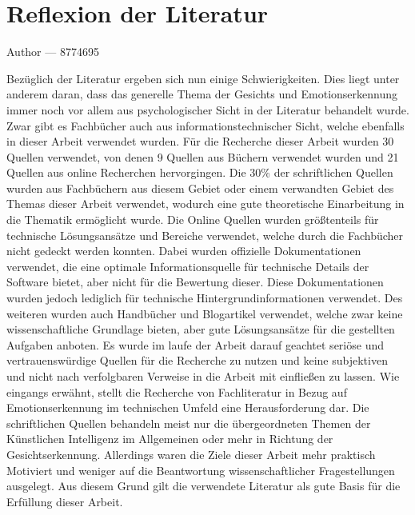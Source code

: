 \documentclass[12pt, a4paper]{report}
\makeatletter
\newcommand{\sectionauthor}[1]{%
  {\parindent0pt\vspace*{-5pt}%
  \large{Author --- }
  \linespread{1.1}\large\scshape#1%
  \par\nobreak\vspace*{35pt} }
  \@afterheading%
}
\makeatother
\begin{document}
\section{Reflexion der Literatur}
\sectionauthor{8774695}
Bezüglich der Literatur ergeben sich nun einige Schwierigkeiten. Dies liegt unter anderem daran, dass das generelle Thema der Gesichts und Emotionserkennung immer noch vor allem aus
psychologischer Sicht in der Literatur behandelt wurde. Zwar gibt es Fachbücher auch aus informationstechnischer Sicht, welche ebenfalls in dieser Arbeit verwendet wurden.
\newline
Für die Recherche dieser Arbeit wurden 30 Quellen verwendet, von denen 9 Quellen aus Büchern verwendet wurden und 21 Quellen aus online Recherchen hervorgingen. Die 30\% der schriftlichen Quellen wurden aus Fachbüchern aus diesem Gebiet oder einem verwandten Gebiet des Themas dieser Arbeit verwendet, wodurch eine gute theoretische Einarbeitung in die Thematik ermöglicht wurde. Die Online Quellen wurden größtenteils für technische Lösungsansätze und Bereiche verwendet, welche durch die Fachbücher nicht gedeckt werden konnten. Dabei wurden offizielle Dokumentationen verwendet, die eine optimale Informationsquelle für technische Details der Software bietet, aber nicht für die Bewertung dieser. Diese Dokumentationen wurden jedoch lediglich für technische Hintergrundinformationen verwendet. Des weiteren wurden auch Handbücher und Blogartikel verwendet, welche zwar keine wissenschaftliche Grundlage bieten, aber gute Lösungsansätze für die gestellten Aufgaben anboten. Es wurde im laufe der Arbeit darauf geachtet seriöse und vertrauenswürdige Quellen für die Recherche zu nutzen und keine subjektiven und nicht nach verfolgbaren Verweise in die Arbeit mit einfließen zu lassen.
\newline
Wie eingangs erwähnt, stellt die Recherche von Fachliteratur in Bezug auf Emotionserkennung im technischen Umfeld eine Herausforderung dar. Die schriftlichen Quellen behandeln meist nur die übergeordneten Themen der Künstlichen Intelligenz im Allgemeinen oder mehr in Richtung der Gesichtserkennung. Allerdings waren die Ziele dieser Arbeit mehr praktisch Motiviert und weniger auf die Beantwortung wissenschaftlicher Fragestellungen ausgelegt. Aus diesem Grund gilt die verwendete Literatur als gute Basis für die Erfüllung dieser Arbeit.
\end{document}
